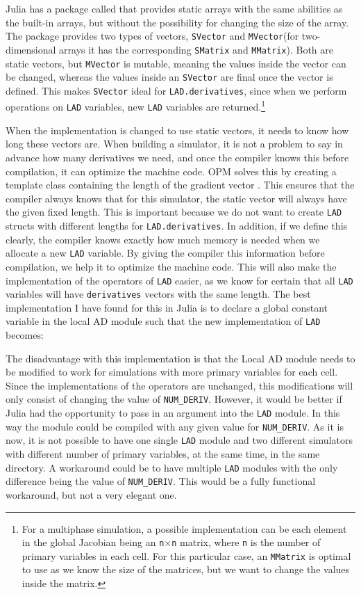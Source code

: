 Julia has a package called \emph{\cite{StaticArrays}} that provides static arrays with the same abilities as the built-in arrays, but without the possibility for changing the size of the array. The package provides two types of vectors, \texttt{SVector} and \texttt{MVector}(for two-dimensional arrays it has the corresponding \texttt{SMatrix} and \texttt{MMatrix}). Both are static vectors, but \texttt{MVector} is mutable, meaning the values inside the vector can be changed, whereas the values inside an \texttt{SVector} are final once the vector is defined. This makes \texttt{SVector} ideal for \texttt{LAD.derivatives}, since when we perform operations on \texttt{LAD} variables, new \texttt{LAD} variables are returned.\footnote{For a multiphase simulation, a possible implementation can be each element in the global Jacobian being an \texttt{n}$\times$\texttt{n} matrix, where \texttt{n} is the number of primary variables in each cell. For this particular case, an \texttt{MMatrix} is optimal to use as we know the size of the matrices, but we want to change the values inside the matrix.} 

When the implementation is changed to use static vectors, it needs to know how long these vectors are. When building a simulator, it is not a problem to say in advance how many derivatives we need, and once the compiler knows this before compilation, it can optimize the machine code. OPM solves this by creating a template class containing the length of the gradient vector \emph{\citep{lauser2018local}}. This ensures that the compiler always knows that for this simulator, the static vector will always have the given fixed length. This is important because we do not want to create \texttt{LAD} structs with different lengths for \texttt{LAD.derivatives}. In addition, if we define this clearly, the compiler knows exactly how much memory is needed when we allocate a new \texttt{LAD} variable. By giving the compiler this information before compilation, we help it to optimize the machine code. This will also make the implementation of the operators of \texttt{LAD} easier, as we know for certain that all \texttt{LAD} variables will have \texttt{derivatives} vectors with the same length. The best implementation I have found for this in Julia is to declare a global constant variable in the local AD module such that the new implementation of \texttt{LAD} becomes:

The disadvantage with this implementation is that the Local AD module needs to be modified to work for simulations with more primary variables for each cell. Since the implementations of the operators are unchanged, this modifications will only consist of changing the value of \texttt{NUM\_DERIV}. However, it would be better if Julia had the opportunity to pass in an argument into the \texttt{LAD} module. In this way the module could be compiled with any given value for \texttt{NUM\_DERIV}. As it is now, it is not possible to have one single \texttt{LAD} module and two different simulators with different number of primary variables, at the same time, in the same directory. A workaround could be to have multiple \texttt{LAD} modules with the only difference being the value of \texttt{NUM\_DERIV}. This would be a fully functional workaround, but not a very elegant one.


